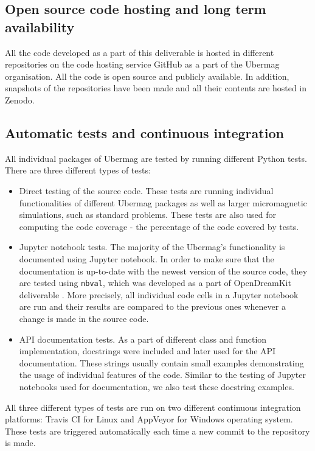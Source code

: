 \documentclass{deliverablereport}
\begin{document}
\subsection{Open source code hosting and long term availability}

All the code developed as a part of this deliverable is hosted in
different repositories on the code hosting service GitHub as a part of
the Ubermag organisation. All the code is open source and publicly
available. In addition, snapshots of the repositories have been made
and all their contents are hosted in Zenodo.

\subsection{Automatic tests and continuous integration}

All individual packages of Ubermag are tested by running different
Python tests. There are three different types of tests:

\begin{itemize}
\item Direct testing of the source code. These tests are running
individual functionalities of different Ubermag packages as well as
larger micromagnetic simulations, such as standard problems. These
tests are also used for computing the code coverage - the percentage
of the code covered by tests.
\item Jupyter notebook tests. The majority of the Ubermag's
functionality is documented using Jupyter notebook. In order to make
sure that the documentation is up-to-date with the newest version of
the source code, they are tested using \texttt{nbval}, which was
developed as a part of OpenDreamKit deliverable
. More precisely, all individual code cells
in a Jupyter notebook are run and their results are compared to the
previous ones whenever a change is made in the source code.
\item API documentation tests. As a part of different class and
  function implementation, docstrings were included and later used for
  the API documentation. These strings usually contain small examples
  demonstrating the usage of individual features of the code. Similar
  to the testing of Jupyter notebooks used for documentation, we also
  test these docstring examples.
\end{itemize}

All three different types of tests are run on two different continuous
integration platforms: Travis CI for Linux and AppVeyor for Windows
operating system. These tests are triggered automatically each time a new commit to
the repository is made.
\end{document}
